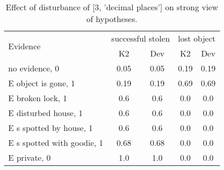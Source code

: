 \begin{table}\begin{tabular}{l|cc|cc}\toprule\multirow{2}{*}{Evidence} & \multicolumn{2}{c}{successful stolen}& \multicolumn{2}{c}{lost object}\\& {K2} & {Dev}& {K2} & {Dev}\\\midrule
no evidence, 0 & 0.05&0.05&0.19&0.19\\E object is gone, 1 & 0.19&0.19&0.69&0.69\\E broken lock, 1 & 0.6&0.6&0.0&0.0\\E disturbed house, 1 & 0.6&0.6&0.0&0.0\\E s spotted by house, 1 & 0.6&0.6&0.0&0.0\\E s spotted with goodie, 1 & 0.68&0.68&0.0&0.0\\E private, 0 & 1.0&1.0&0.0&0.0\\\bottomrule\end{tabular}\caption{Effect of disturbance of [3, 'decimal places'] on strong view of hypotheses.}\end{table}